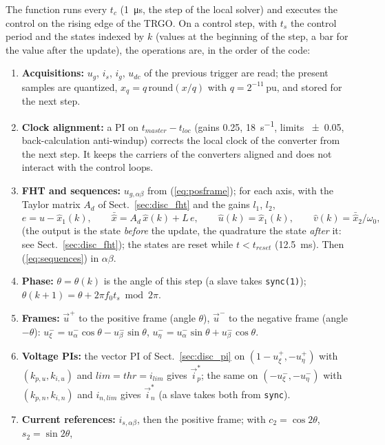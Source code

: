 \documentclass[10pt,a4paper]{scrartcl}
\newcommand{\ts}{t_s}
\newcommand{\wo}{\omega_0}
\newcommand{\kpu}{k_{p,u}}
\newcommand{\kiu}{k_{i,u}}
\newcommand{\kpn}{k_{p,n}}
\newcommand{\kin}{k_{i,n}}
\newcommand{\pu}{\,\mathrm{pu}}
\newcommand{\code}[1]{\texttt{#1}}
\newcommand{\uhat}{\hat{u}}
\newcommand{\vhat}{\hat{v}}
\begin{document}
\begin{onehalfspace}
The function runs every $t_c$ (\SI{1}{\micro s}, the step of the local solver) and executes the control on the rising edge of the TRGO. On a control step, with $\ts$ the control period and the states indexed by $k$ (values at the beginning of the step, a bar for the value after the update), the operations are, in the order of the code:
\begin{enumerate}
\item \textbf{Acquisitions:} $u_g$, $i_s$, $i_g$, $u_{dc}$ of the previous trigger are read; the present samples are quantized, $x_q = q\,\mathrm{round}(x/q)$ with $q = 2^{-11}\pu$, and stored for the next step.
\item \textbf{Clock alignment:} a PI on $t_{master} - t_{loc}$ (gains 0.25, \SI{18}{s^{-1}}, limits \SI{\pm 0.05}{}, back-calculation anti-windup) corrects the local clock of the converter from the next step. It keeps the carriers of the converters aligned and does not interact with the control loops.
\item \textbf{FHT and sequences:} $u_{g,\alpha\beta}$ from (\ref{eq:posframe}); for each axis, with the Taylor matrix $A_d$ of Sect.~\ref{sec:disc_fht} and the gains $l_1$, $l_2$,
\begin{equation}
e = u - \hat x_1(k), \qquad \bar{\hat x} = A_d\,\hat x(k) + L\,e, \qquad \uhat(k) = \hat x_1(k), \qquad \vhat(k) = \bar{\hat x}_2/\wo,
\label{eq:fht_step}
\end{equation}
(the output is the state \emph{before} the update, the quadrature the state \emph{after} it: see Sect.~\ref{sec:disc_fht}); the states are reset while $t < t_{reset}$ (\SI{12.5}{ms}). Then (\ref{eq:sequences}) in $\alpha\beta$.
\item \textbf{Phase:} $\theta = \theta(k)$ is the angle of this step (a slave takes \code{sync(1)}); $\theta(k+1) = \theta + 2\pi f_0\ts \bmod 2\pi$.
\item \textbf{Frames:} $\vec u^+$ to the positive frame (angle $\theta$), $\vec u^-$ to the negative frame (angle $-\theta$): $u^-_\xi = u^-_\alpha\cos\theta - u^-_\beta\sin\theta$, $u^-_\eta = u^-_\alpha\sin\theta + u^-_\beta\cos\theta$.
\item \textbf{Voltage PIs:} the vector PI of Sect.~\ref{sec:disc_pi} on $(1 - u^+_\xi, -u^+_\eta)$ with $(\kpu, \kiu)$ and $lim = thr = i_{lim}$ gives $\vec i^*_p$; the same on $(-u^-_\xi, -u^-_\eta)$ with $(\kpn, \kin)$ and $i_{n,lim}$ gives $\vec i^*_n$ (a slave takes both from \code{sync}).
\item \textbf{Current references:} $i_{s,\alpha\beta}$, then the positive frame; with $c_2 = \cos2\theta$, $s_2 = \sin2\theta$,

\end{enumerate}
\end{onehalfspace}
\end{document}
